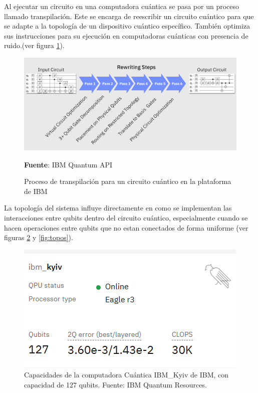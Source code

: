 \documentclass[letterpaper,12pt]{thesisECFM}
\theoremstyle{plain}
\theoremstyle{definition}
\theoremstyle{definition}
\theoremstyle{remark}
\newcommand{\1}{\mathbb{1}}
\begin{document}
Al ejecutar un circuito en una computadora cuántica se pasa por un proceso llamado transpilación. Este se encarga de reescribir un circuito cuántico para que se adapte a la topología de un dispositivo cuántico específico. También optimiza sus instrucciones para su ejecución en computadoras cuánticas con presencia de ruido.(ver figura \ref{fig:transpiling}). 
\begin{figure}[h]
    \centering
    \includegraphics[scale=0.20]{imagenes/transpiling_core_steps.png}
    \caption{Proceso de transpilación para un circuito cuántico en la plataforma de IBM} \textbf{Fuente}: IBM Quantum API \cite{qiskit_transpiler}
    \label{fig:transpiling}
\end{figure}
La topología del sistema influye directamente en como se implementan las interacciones entre qubits dentro del circuito cuántico, especialmente cuando se hacen operaciones entre qubits que no estan conectados de forma uniforme (ver figuras \ref{fig:topos_kyiv} y  \ref{fig:topos}). 

\begin{figure}[h]
    \centering
    \includegraphics[scale=0.7]{imagenes/ibm_kyiv_front.png}
    \caption{Capacidades de la computadora Cuántica IBM\_Kyiv de IBM, con capacidad de 127 qubits. Fuente: IBM Quantum Resources. \cite{ibm_quantum_resources}}
    \label{fig:topos_kyiv}
\end{figure}
\end{document}
